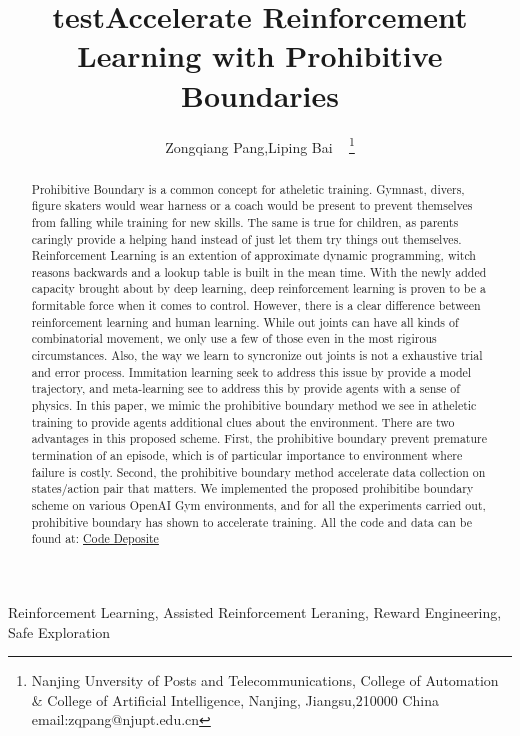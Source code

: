 \documentclass[journal]{IEEEtran}
\begin{document}
    \title{test}
\title{Accelerate Reinforcement Learning with Prohibitive Boundaries}

\author{ Zongqiang Pang,Liping Bai ~ \thanks{Nanjing Unversity of Posts and Telecommunications, College of Automation \& College of Artificial Intelligence, Nanjing, Jiangsu,210000 China email:zqpang@njupt.edu.cn}}
\maketitle
\begin{abstract}
Prohibitive Boundary is a common concept for atheletic training. Gymnast, divers, figure skaters would wear harness or a coach would be present to prevent themselves from falling while training for new skills. The same is true for children, as parents caringly provide a helping hand instead of just let them try things out themselves. Reinforcement Learning is an extention of approximate dynamic programming, witch reasons backwards and a lookup table is built in the mean time. With the newly added capacity brought about by deep learning, deep reinforcement learning is proven to be a formitable force when it comes to control. However, there is a clear difference between reinforcement learning and human learning. While out joints can have all kinds of combinatorial movement, we only use a few of those even in the most rigirous circumstances. Also, the way we learn to syncronize out joints is not a exhaustive trial and error process. Immitation learning seek to address this issue by provide a model trajectory, and meta-learning see to address this by provide agents with a sense of physics. In this paper, we mimic the prohibitive boundary method we see in atheletic training to provide agents additional clues about the environment. There are two advantages in this proposed scheme. First, the prohibitive boundary prevent premature termination of an episode, which is of particular importance to environment where failure is costly. Second, the prohibitive boundary method accelerate data collection on states/action pair that matters. We implemented the proposed prohibitibe boundary scheme on various OpenAI Gym environments, and for all the experiments carried out, prohibitive boundary has shown to accelerate training. All the code and data can be found at: \href{https://github.com/BaiLiping/Prohibitive_Boundary}{Code Deposite}
\end{abstract}
\begin{IEEEkeywords}
Reinforcement Learning, Assisted Reinforcement Leraning, Reward Engineering, Safe Exploration
\end{IEEEkeywords}
\IEEEpeerreviewmaketitle
\end{document}
